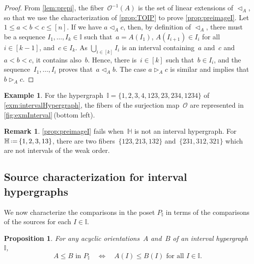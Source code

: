 \documentclass{amsart}
\newtheorem{proposition}[theorem]{Proposition}
\theoremstyle{definition}
\newtheorem{example}[theorem]{Example}
\newtheorem{remark}[theorem]{Remark}
\newcommand{\eqdef}{\mbox{\,\raisebox{0.2ex}{\scriptsize\ensuremath{\mathrm:}}\ensuremath{=}\,}} %
\newcommand{\less}{\vartriangleleft} %
\newcommand{\more}{\vartriangleright} %
\newcommand{\Or}{\mathcal O}  %
\newcommand{\HH}{\mathbb H}  %
\newcommand{\II}{\mathbb I} %
\begin{document}
\begin{proof}
From \cref{lem:prepi}, the fiber~$\Or^{-1}(A)$ is the set of linear extensions of $\less_A$, so that we use the characterization of \cref{prop:TOIP} to prove \cref{prop:preimageI}.
Let $1 \le a < b < c \le [n]$.
If we have $a \less_{A} c$, then, by definition of $\less_A$, there must be a sequence $I_1, \dots, I_k \in \II$ such that~$a = A(I_1)$, $A(I_{i+1}) \in I_i$ for all~$i \in [k-1]$, and~$c \in I_k$.
As $\bigcup_{i \in [k]} I_i$ is an interval containing~$a$ and~$c$ and~$a < b < c$, it contains also~$b$.
Hence, there is~$i \in [k]$ such that~$b \in I_i$, and the sequence~$I_1, \dots, I_i$ proves that~$a \less_{A} b$.
The case $a \more_{A} c$ is similar and  implies that $b \more_A c$.
\end{proof}

\begin{example}
For the hypergraph~$\II = \{ 1, 2, 3, 4,123, 23, 234, 1234 \}$ of \cref{exm:intervalHypergraph}, the fibers of the surjection map~$\Or$ are represented in \cref{fig:exmInterval}\,(bottom left).
\end{example}

\begin{remark}
\cref{prop:preimageI} fails when~$\HH$ is not an interval hypergraph.
For~$\HH \eqdef \{1, 2, 3, 13\}$, there are two fibers~$\{123, 213, 132\}$ and~$\{231, 312, 321\}$ which are not intervals of the weak order.
\end{remark}


\subsection{Source characterization for interval hypergraphs}  
\label{subsec:sourceAcyclicI}

We now characterize the comparisons in the poset $P_\II$ in terms of the comparisons of the sources for each $I\in \II$.

\begin{proposition}
\label{prop:sourceOrderI}
For any acyclic orientations~$A$ and~$B$ of an interval hypergraph~$\II$,
\[
A \le B \text{ in } P_\II \quad \iff \quad A(I) \le B(I) \text{ for all } I \in \II .
\]
\end{proposition}
\end{document}
